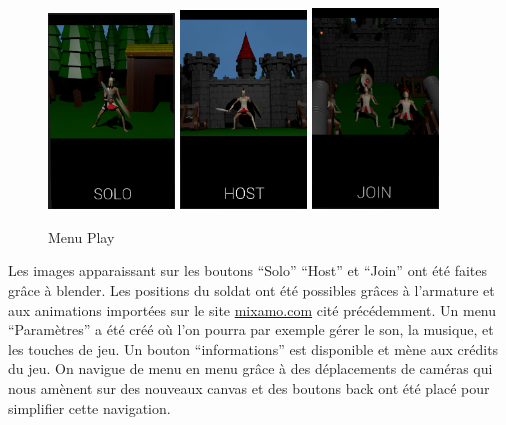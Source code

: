 \documentclass[12pt]{report}
\begin{document}
\begin{figure}[H]
    \centering
    \includegraphics[width=0.3\textwidth]{SoloIcon}
    \includegraphics[width=0.3\textwidth]{HostIcon}
    \includegraphics[width=0.3\textwidth]{JoinIcon}
    \caption{Menu Play}
\end{figure}

Les images apparaissant sur les boutons “Solo” “Host” et “Join” ont été faites
grâce à blender. Les positions du soldat ont été possibles grâces à l’armature
et aux animations importées sur le site \url{mixamo.com} cité précédemment. Un
menu “Paramètres” a été créé où l’on pourra par exemple gérer le son, la
musique, et les touches de jeu. Un bouton “informations” est disponible et mène
aux crédits du jeu. On navigue de menu en menu grâce à des déplacements de
caméras qui nous amènent sur des nouveaux canvas et des boutons back ont été
placé pour simplifier cette navigation.
\end{document}
